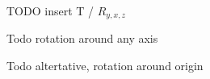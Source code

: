 

TODO insert T / $R_{y,x,z}$ \

Todo rotation around any axis \

Todo altertative, rotation around origin \
